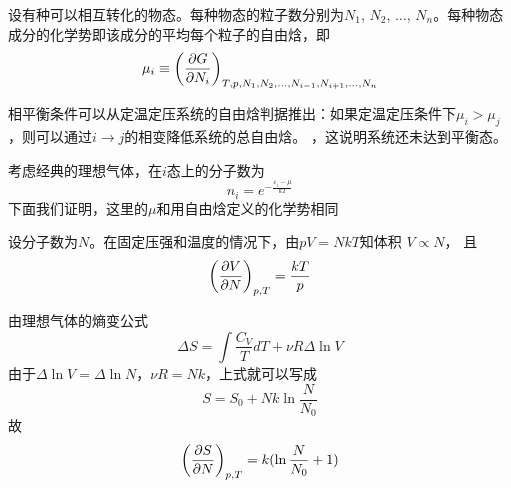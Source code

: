 \documentclass[CJK]{beamer}
\begin{document}
\begin{frame}
\bch
设有种可以相互转化的物态。每种物态的粒子数分别为$N_1$, $N_2$, $\ldots$, $N_n$。每种物态成分的化学势即该成分的平均每个粒子的自由焓，即
$$ \mu_i \equiv \left(\frac{\partial G}{\partial N_i}\right)_{T,p,N_1, N_2, \ldots, N_{i-1}, N_{i+1}, \ldots, N_n} $$

\skipline

相平衡条件可以从定温定压系统的自由焓判据推出：如果定温定压条件下$ \mu_i > \mu_j$，则可以通过$i\rightarrow j$的相变降低系统的总自由焓。
，这说明系统还未达到平衡态。
\ech
\end{frame}


\begin{frame}
\bch
{\small
考虑经典的理想气体，在$i$态上的分子数为
$$ n_i = e^{-\frac{\varepsilon_i-\mu}{kT}}$$
下面我们证明，这里的$\mu$和用自由焓定义的化学势相同}

{\scriptsize
设分子数为$N$。在固定压强和温度的情况下，由$pV = NkT$知体积
$V \propto N$， 且
$$\left(\frac{\partial V}{\partial N}\right)_{p,T} = \frac{kT}{p} $$

由理想气体的熵变公式
$$ \Delta S = \int \frac{C_V}{T} dT + \nu R \Delta \ln V $$
由于$\Delta \ln V =\Delta \ln N$，$\nu R = Nk$，上式就可以写成
$$ S = S_0 + N k \ln \frac{N}{N_0} $$
故
$$\left(\frac{\partial S}{\partial N}\right)_{p,T} = k (\ln \frac{N}{N_0} + 1) $$




}
\ech
\end{frame}
\end{document}
